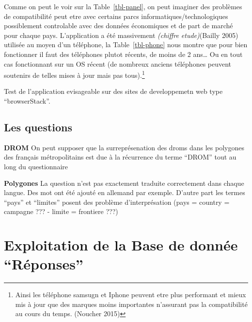 \documentclass[
  12pt,
  a4paper,
]{scrbook}
\begin{document}
Comme on peut le voir sur la Table~\ref{tbl-panel}, on peut imaginer des
problèmes de compatibilité peut etre avec certains parcs
informatiques/technologiques possiblement controlable avec des données
économiques et de part de marché pour chaque pays. L'application a été
massivement \emph{(chiffre etude)}(Bailly 2005) utilisée au moyen d'un
téléphone, la Table~\ref{tbl-phone} nous montre que pour bien
fonctionner il faut des téléphones plutot récents, de moins de 2
ans\ldots{} Ou en tout cas fonctionnant sur un OS récent (de nombreux
anciens téléphones peuvent soutenirs de telles mises à jour mais pas
tous).\footnote{Ainsi les téléphone samsugn et Iphone peuvent etre plus
  performant et mieux mis à jour que des marques moins importantes
  n'assurant pas la compatibilité au cours du temps. (Noucher 2015)}

Test de l'application evisageable sur des sites de developpemetn web
type ``browserStack''.

\hypertarget{les-questions}{%
\subsection{Les questions}\label{les-questions}}

\textbf{DROM} On peut supposer que la surreprésenation des droms dans
les polygones des français métropolitains est due à la récurrence du
terme ``DROM'' tout au long du questionnaire

\textbf{Polygones} La question n'est pas exactement traduite
correctement dans chaque langue. Des mot ont été ajouté en allemand par
exemple. D'autre part les termes ``pays'' et ``limites'' posent des
problème d'interprésation (pays = country = campagne ??? - limite =
frontiere ???)

\hypertarget{exploitation-de-la-base-de-donnuxe9e-ruxe9ponses}{%
\section{Exploitation de la Base de donnée
``Réponses''}\label{exploitation-de-la-base-de-donnuxe9e-ruxe9ponses}}
\end{document}
